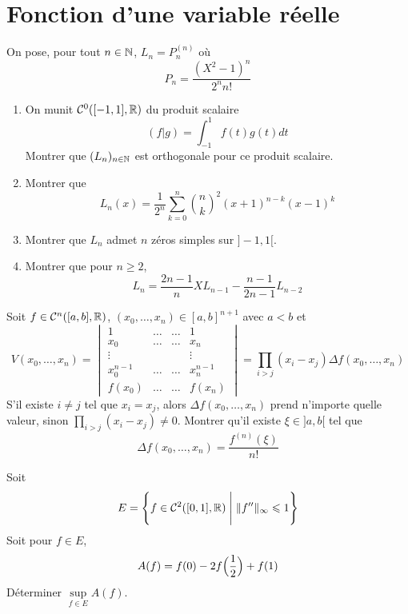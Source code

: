 \section{Fonction d'une variable réelle}

\begin{exercise}
	On pose, pour tout $n\in\mathbb{N}$, $L_{n}=P_{n}^{(n)}$ où 
	$$P_{n}=\frac{(X^{2}-1)^{n}}{2^{n}n!}$$
	\begin{enumerate}
		\item On munit $\mathcal{C}^{0}([-1,1],\mathbb{R})$ du produit scalaire
		$$(f|g)=\int_{-1}^{1}f(t)g(t)dt$$
		Montrer que $(L_{n})_{n\in\mathbb{N}}$ est orthogonale pour ce produit scalaire.

		\item Montrer que 
		$$L_{n}(x)=\frac{1}{2^{n}}\sum_{k=0}^{n}\binom{n}{k}^{2}(x+1)^{n-k}(x-1)^{k}$$
		
		\item Montrer que $L_{n}$ admet $n$ zéros simples sur $]-1,1[$.
		\item Montrer que pour $n\geqslant2$,
		$$L_{n}=\frac{2n-1}{n}XL_{n-1}-\frac{n-1}{2n-1}L_{n-2}$$
	\end{enumerate}
\end{exercise}

\begin{exercise}
	Soit $f\in\mathcal{C}^{n}([a,b],\mathbb{R})$, $(x_{0},\dots,x_{n})\in[a,b]^{n+1}$ avec $a<b$ et
	$$V(x_{0},\dots,x_{n})
	=
	\begin{vmatrix}
		1 & \dots & \dots & 1\\
		x_{0} & \dots & \dots &x_{n}\\
		\vdots & & &\vdots\\
		x_{0}^{n-1} & \dots &\dots  &x_{n}^{n-1}\\
		f(x_{0}) & \dots  &\dots & f(x_{n})
	\end{vmatrix}
	=\prod_{i>j}(x_{i}-x_{j})\Delta f(x_{0},\dots,x_{n})$$
	S'il existe $i\neq j$ tel que $x_{i}=x_{j}$, alors $\Delta f(x_{0},\dots,x_{n})$ prend n'importe quelle valeur, sinon $\prod_{i>j}(x_{i}-x_{j})\neq0$. Montrer qu'il existe $\xi\in]a,b[$ tel que 
	$$\Delta f(x_{0},\dots,x_{n})=\frac{f^{(n)}(\xi)}{n!}$$
\end{exercise}

\begin{exercise}
	Soit 
	$$E=\Biggl\{f\in\mathcal{C}^{2}([0,1],\mathbb{R})\Biggm|\Vert f''\Vert_{\infty}\leqslant 1\Biggr\}$$
	Soit pour $f\in E$,
	$$A(f)=f(0)-2f\Bigl(\frac{1}{2}\Bigr)+f(1)$$
	Déterminer $\sup\limits_{f\in E}A(f)$.
\end{exercise}

